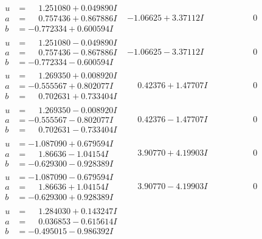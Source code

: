 \documentclass[1p]{elsarticle_modified}
\theoremstyle{definition}
\begin{document}
$$\begin{array}{c|c|c}
\begin{aligned}
u &= \phantom{-}1.251080 + 0.049890 I \\
a &= \phantom{-}0.757436 + 0.867886 I \\
b &= -0.772334 + 0.600594 I\end{aligned}
 & -1.06625 + 3.37112 I & \phantom{-0.000000 } 0 \\ \hline\begin{aligned}
u &= \phantom{-}1.251080 - 0.049890 I \\
a &= \phantom{-}0.757436 - 0.867886 I \\
b &= -0.772334 - 0.600594 I\end{aligned}
 & -1.06625 - 3.37112 I & \phantom{-0.000000 } 0 \\ \hline\begin{aligned}
u &= \phantom{-}1.269350 + 0.008920 I \\
a &= -0.555567 + 0.802077 I \\
b &= \phantom{-}0.702631 + 0.733404 I\end{aligned}
 & \phantom{-}0.42376 + 1.47707 I & \phantom{-0.000000 } 0 \\ \hline\begin{aligned}
u &= \phantom{-}1.269350 - 0.008920 I \\
a &= -0.555567 - 0.802077 I \\
b &= \phantom{-}0.702631 - 0.733404 I\end{aligned}
 & \phantom{-}0.42376 - 1.47707 I & \phantom{-0.000000 } 0 \\ \hline\begin{aligned}
u &= -1.087090 + 0.679594 I \\
a &= \phantom{-}1.86636 - 1.04154 I \\
b &= -0.629300 - 0.928389 I\end{aligned}
 & \phantom{-}3.90770 + 4.19903 I & \phantom{-0.000000 } 0 \\ \hline\begin{aligned}
u &= -1.087090 - 0.679594 I \\
a &= \phantom{-}1.86636 + 1.04154 I \\
b &= -0.629300 + 0.928389 I\end{aligned}
 & \phantom{-}3.90770 - 4.19903 I & \phantom{-0.000000 } 0 \\ \hline\begin{aligned}
u &= \phantom{-}1.284030 + 0.143247 I \\
a &= \phantom{-}0.036853 - 0.615614 I \\
b &= -0.495015 - 0.986392 I\end{aligned}

\end{array}$$
\end{document}
